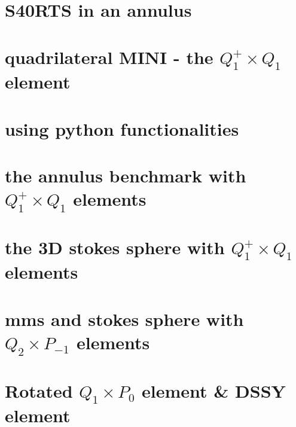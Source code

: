 \documentclass[a4paper,11pt]{report}
\begin{document}
\chapter{S40RTS in an annulus \label{f71}} %

\chapter{quadrilateral MINI - the $Q_1^+\times Q_1$ element \label{f72}} %

\chapter{using python functionalities\label{f73}} %

\chapter{the annulus benchmark with $Q_1^+\times Q_1$ elements \label{f74}} %

\chapter{the 3D stokes sphere with $Q_1^+\times Q_1$ elements \label{f75}} %

\chapter{mms and stokes sphere with $Q_2\times P_{-1}$ elements \label{f76}} %

\chapter{Rotated $Q_1\times P_0$ element \& DSSY element \label{f77}} %
\end{document}

